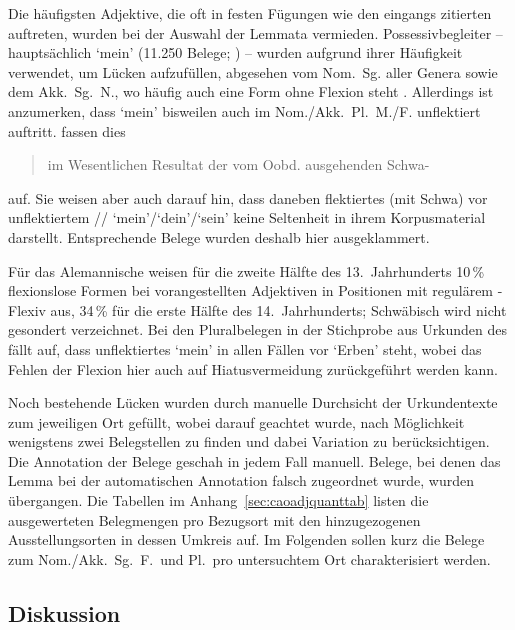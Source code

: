 Die häufigsten Adjektive, die oft in festen Fügungen wie den eingangs zitierten
auftreten, wurden bei der Auswahl der Lemmata vermieden. Possessivbegleiter --
hauptsächlich  `mein' (11.250 Belege; \cite[1231--1232]{wmu2}) --
wurden aufgrund ihrer Häufigkeit verwendet, um Lücken aufzufüllen,
abgesehen vom Nom.\ Sg. aller Genera sowie dem Akk.\ Sg.\ N., wo häufig auch
eine Form ohne Flexion steht \autocites[216]{paul2007}[507, 510--511]{ksw2}.
Allerdings ist anzumerken, dass  `mein' bisweilen auch im Nom./Akk.\
Pl.\ M./F. unflektiert auftritt. \citet[510]{ksw2} fassen dies \blockquote{im
Wesentlichen \textins{als} Resultat der vom Oobd. ausgehenden
Schwa-} auf. Sie weisen aber auch darauf hin, dass daneben
flektiertes \norm{alle} (mit Schwa) vor unflektiertem
// `mein'/`dein'/`sein' keine Seltenheit in ihrem
Korpusmaterial darstellt. Entsprechende Belege wurden deshalb hier
ausgeklammert.

Für das Alemannische weisen \citet[271, Abbildung~A~47]{ksw2}
für die zweite Hälfte des 13.~Jahrhunderts 10\,\% flexionslose Formen bei
vorangestellten Adjektiven in Positionen mit regulärem \norm{e}-Flexiv aus,
34\,\% für die erste Hälfte des 14.~Jahrhunderts; Schwäbisch wird nicht
gesondert verzeichnet. Bei den Pluralbelegen in der Stichprobe aus
Urkunden\is{Urkunde} des \CAO{} fällt auf, dass unflektiertes  `mein'
in allen Fällen vor \norm{ėrben} `Erben' steht, wobei das Fehlen der Flexion
hier auch auf Hiatusvermeidung\is{Hiatus} zurückgeführt werden kann.

Noch bestehende Lücken wurden durch manuelle Durchsicht der Urkundentexte zum
jeweiligen Ort gefüllt, wobei darauf geachtet wurde, nach Möglichkeit
wenigstens zwei Belegstellen zu finden und dabei Variation zu berücksichtigen.
Die Annotation\is{Annotation} der Belege geschah in jedem Fall manuell. Belege,
bei denen das Lemma bei der automatischen Annotation falsch zugeordnet wurde,
wurden übergangen. Die Tabellen im Anhang~\ref{sec:caoadjquanttab} listen die
ausgewerteten Belegmengen pro Bezugsort mit den hinzugezogenen
Ausstellungs\-orten in dessen Umkreis auf. Im Folgenden sollen kurz die Belege
zum Nom./Akk.\ Sg.\ F.\ und Pl.\ pro untersuchtem Ort charakterisiert werden.


\subsection{Diskussion}
\label{subsec:cao_adjflex_disc}

